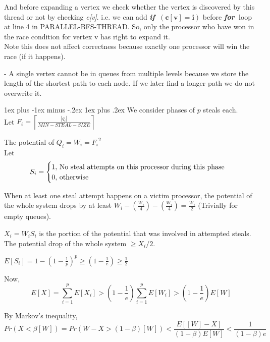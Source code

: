 \documentclass[11pt]{article}
\makeatletter
\renewcommand{\subsection}{\@startsection{subsection}{2}{0mm}%
                                     {1ex plus -1ex minus -.2ex}%
                                     {1ex plus .2ex}%
                                     {\normalfont\large\bfseries}}%
\newcommand{\ceil}[1]{\ensuremath{\left\lceil#1\right\rceil}}
\newcommand{\xif}{{\bf{\em{if~}}}}
\newcommand{\xfor}{{\bf{\em{for~}}}}
\makeatother
\begin{document}
And before expanding a vertex we check whether the vertex is discovered by this thread or not by checking {\it c[v]}. i.e. we can add \xif $\mathbf{(c[v] = i)}$ before \xfor loop at line 4 in PARALLEL-BFS-THREAD. So, only the processor who have won in the race condition for vertex v has right to expand it.\\  Note this does not affect correctness because exactly one processor will win the race (if it happens).

- A single vertex cannot be in queues from multiple levels because we store the length of the shortest path to each node.  If we later find a longer path we do not overwrite it.

\subsection{}
We consider phases of $p$ steals each.\\
Let $F_i = \ceil {\frac {|q_i|}{MIN-STEAL-SIZE}}$

The potential of $Q_i = W_i = {F_i}^2$\\
Let \[
S_i = \begin{cases}
1 , $ No steal attempts on this processor during this phase$\\
0 , $  otherwise$
\end{cases}
\]

When at least one steal attempt happens on a victim processor, the potential of the whole system drops by at least
$W_i - (\frac{W_i}{4}) - (\frac{W_i}{4}) = \frac{W_i}{2}$ (Trivially for empty queues).

$X_i = W_i S_i$ is the portion of the potential that was involved in attempted steals.
The potential drop of the whole system $\ge X_i/2$.


$E[S_i] = 1 - {(1-\frac{1}{p})}^p \geq (1-\frac{1}{e}) \geq \frac{1}{2}$

Now, \[
E \left[ X \right] = \sum \limits_{i=1}^p E \left[ X_i \right] > \left( 1 - \frac{1}{e} \right) \sum \limits_{i=1}^p E[W_i] >\left( 1 - \frac{1}{e} \right) E \left [W \right ]
\]

By Markov's inequality,\\
\[Pr \left( X < \beta [W] \right) = Pr \left( W - X > (1 - \beta)[W] \right) < \frac {E \left[ [W] - X \right]}{\left(1 - \beta \right)  E[W]} < \frac {1}{\left(1 - \beta \right) e }
\] \\\\\\\\
\end{document}

